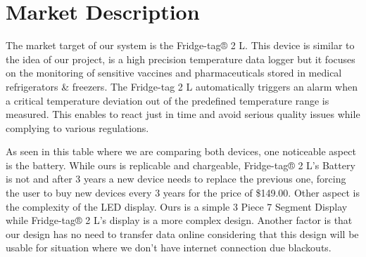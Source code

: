 \section{Market Description}
The market target of our system is the Fridge-tag® 2 L\cite{RefrigeratorTemperatureMonitoring}. This device is similar to the idea of our project, is a high precision temperature data logger but it focuses on the monitoring of sensitive vaccines and pharmaceuticals stored in medical refrigerators \& freezers. The Fridge-tag 2 L automatically triggers an alarm when a critical temperature deviation out of the predefined temperature range is measured. This enables to react just in time and avoid serious quality issues while complying to various regulations.

As seen in this table where we are comparing both devices, one noticeable aspect is the battery. While ours is replicable and chargeable, Fridge-tag® 2 L's Battery is not and after 3 years a new device needs to replace the previous one, forcing the user to buy new devices every 3 years for the price of \$149.00. Other aspect is the complexity of the LED display. Ours is a simple 3 Piece 7 Segment Display while Fridge-tag® 2 L's display is a more complex design. Another factor is that our design has no need to transfer data online considering that this design will be usable for situation where we don't have internet connection due blackouts.

